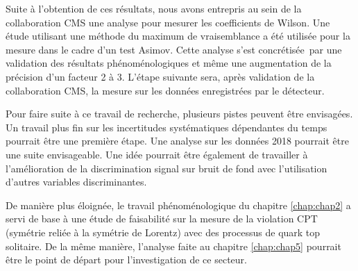 Suite à l'obtention de ces résultats, nous avons entrepris au sein de la collaboration CMS une analyse pour mesurer les coefficients de Wilson. Une étude utilisant une méthode du maximum de vraisemblance a été utilisée pour la mesure dans le cadre d'un test Asimov. Cette analyse s'est concrétisée par une validation des résultats phénoménologiques et même une augmentation de la précision d’un facteur \num{2} à \num{3}. L'étape suivante sera, après validation de la collaboration CMS, la mesure sur les données enregistrées par le détecteur. 
\newline

Pour faire suite à ce travail de recherche, plusieurs pistes peuvent être envisagées. Un travail plus fin sur les incertitudes systématiques dépendantes du temps pourrait être une première étape. Une analyse sur les données 2018 pourrait être une suite envisageable. Une idée pourrait être également de travailler à l'amélioration de la discrimination signal sur bruit de fond avec l'utilisation d'autres variables discriminantes.
\newline

De manière plus éloignée, le travail phénoménologique du chapitre \ref{chap:chap2} a servi de base à une étude de faisabilité sur la mesure de la violation CPT (symétrie reliée à la symétrie de Lorentz) avec des processus de quark top solitaire. De la même manière, l'analyse faite au chapitre \ref{chap:chap5} pourrait être le point de départ pour l'investigation de ce secteur.